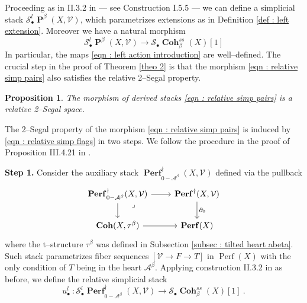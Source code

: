\documentclass[11pt]{article}
\newtheorem{proposition}[theorem]{Proposition}
\newcommand{\abeta}{\mathcal{A}^{\beta}}
\newcommand{\perf}{\operatorname{Perf}(X)}
\newcommand{\perfstack}{\boldsymbol{\operatorname{Perf}}(X)}
\newcommand{\cohbetassstack}{\boldsymbol{\operatorname{Coh}}^{ss}_{\beta}(X)}
\newcommand{\cohflat}{\boldsymbol{\operatorname{Coh}}}
\newcommand{\framing}{\mathcal{V}}
\newcommand{\pairs}{\boldsymbol{\operatorname{P}}^{\beta}(X,\mathcal{V})}
\newcommand{\flags}{\boldsymbol{\operatorname{Perf}}^{\dagger}(X,\mathcal{V})}
\newcommand{\waldhausen}{\mathcal{S}_{\bullet}}
\begin{document}
\noindent Proceeding as in II.3.2 in \cite{dps} --- see  Construction I.5.5 --- we can define a simplicial stack $\waldhausen^l\pairs$, which parametrizes extensions as in Definition \ref{def : left extension}. Moreover we have a natural morphism
\begin{equation}\label{eqn : relative simp pairs}
    \waldhausen^l\pairs \longrightarrow \waldhausen \cohbetassstack[1]
\end{equation}
In particular, the maps \eqref{eqn : left action introduction} are well--defined. The crucial step in the proof of Theorem \ref{theo 2} is that the morphism \eqref{eqn : relative simp pairs} also satisfies the relative 2--Segal property.

\begin{proposition}\label{prop : left segal}
    The morphism of derived stacks \eqref{eqn : relative simp pairs} is a relative 2--Segal space.
\end{proposition}

\noindent The 2--Segal property of the morphism \eqref{eqn : relative simp pairs} is induced by \eqref{eqn : relative simp flags} in two steps. We follow the procedure in the proof of Proposition III.4.21 in \cite{dps}.
\medskip

\noindent \textbf{Step 1. }Consider the auxiliary stack $\boldsymbol{\operatorname{Perf}}^{\dagger}_{0-\abeta}(X,\framing)$ defined via the pullback
    \begin{equation}\label{eqn: aux stack}
    \begin{tikzcd}
	{\boldsymbol{\operatorname{Perf}}^{\dagger}_{0-\abeta}(X,\framing)} & \flags \\
	{\cohflat(X,\tau^\beta)} & \perfstack
	\arrow[from=1-1, to=1-2]
	\arrow[ from=1-1, to=2-1]
	\arrow["{\partial_0}", from=1-2, to=2-2]
	\arrow[""{name=0, anchor=center, inner sep=0}, from=2-1, to=2-2]
	\arrow["\lrcorner"{anchor=center, pos=0.125}, draw=none, from=1-1, to=0]
\end{tikzcd}
    \end{equation}
    where the t--structure $\tau^\beta$ was defined in Subsection \ref{subsec : tilted heart abeta}. Such stack parametrizes fiber sequences $[\framing\rightarrow F \rightarrow T]$ in $\perf$ with the only condition of $T$ being in the heart $\abeta$. Applying construction II.3.2 in \cite{dps} as before, we define the relative simplicial stack
    \begin{equation}\label{eqn : aux relative stack}
        u_{\bullet}^l \ \colon \waldhausen^l\boldsymbol{\operatorname{Perf}}^{\dagger}_{0-\abeta}(X,\framing) \longrightarrow \waldhausen\cohbetassstack[1] \ .
    \end{equation}
\end{document}
